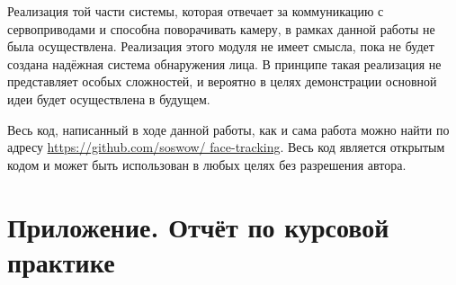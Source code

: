 \documentclass[12pt]{report}
\begin{document}
Реализация той части системы, которая отвечает за коммуникацию с сервоприводами и способна поворачивать камеру, в 
рамках данной работы не была осуществлена. Реализация этого модуля не имеет смысла, пока не будет создана надёжная 
система обнаружения лица. В принципе такая реализация не представляет особых сложностей, и вероятно в целях 
демонстрации основной идеи будет осуществлена в будущем. 

Весь код, написанный в ходе данной работы, как и сама работа можно найти по адресу \url{https://github.com/soswow/
face-tracking}. Весь код является открытым кодом и может быть использован в любых целях без разрешения автора.

\appendix
\chapter{Приложение. Отчёт по курсовой практике}









\end{document}
